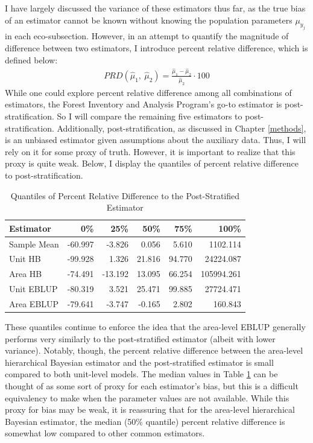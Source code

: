 \documentclass[12pt,twoside]{reedthesis}
\begin{document}
I have largely discussed the variance of these estimators thus far, as the true bias of an estimator cannot be known without knowing the population parameters \(\mu_{y_j}\) in each eco-subsection. However, in an attempt to quantify the magnitude of difference between two estimators, I introduce percent relative difference, which is defined below:
\begin{align*}
PRD(\hat\mu_1,~ \hat\mu_2) = \frac{\hat \mu_1 - \hat\mu_2}{\hat\mu_2} \cdot 100
\end{align*}
While one could explore percent relative difference among all combinations of estimators, the Forest Inventory and Analysis Program's go-to estimator is post-stratification. So I will compare the remaining five estimators to post-stratification. Additionally, post-stratification, as discussed in Chapter \ref{methods}, is an unbiased estimator given assumptions about the auxiliary data. Thus, I will rely on it for some proxy of truth. However, it is important to realize that this proxy is quite weak. Below, I display the quantiles of percent relative difference to post-stratification.
\begin{longtable}[t]{lrrrrr}
\caption{\label{tab:prd-tab}Quantiles of Percent Relative Difference to the Post-Stratified Estimator}\\
\toprule
Estimator & 0\% & 25\% & 50\% & 75\% & 100\%\\
\midrule
Sample Mean & -60.997 & -3.826 & 0.056 & 5.610 & 1102.114\\
Unit HB & -99.928 & 1.326 & 21.816 & 94.770 & 24224.087\\
Area HB & -74.491 & -13.192 & 13.095 & 66.254 & 105994.261\\
Unit EBLUP & -80.319 & 3.521 & 25.471 & 99.885 & 27724.471\\
Area EBLUP & -79.641 & -3.747 & -0.165 & 2.802 & 160.843\\
\bottomrule
\end{longtable}
These quantiles continue to enforce the idea that the area-level EBLUP generally performs very similarly to the post-stratified estimator (albeit with lower variance). Notably, though, the percent relative difference between the area-level hierarchical Bayesian estimator and the post-stratified estimator is small compared to both unit-level models. The median values in Table \ref{tab:prd-tab} can be thought of as some sort of proxy for each estimator's bias, but this is a difficult equivalency to make when the parameter values are not available. While this proxy for bias may be weak, it is reassuring that for the area-level hierarchical Bayesian estimator, the median (50\% quantile) percent relative difference is somewhat low compared to other common estimators.
\end{document}
